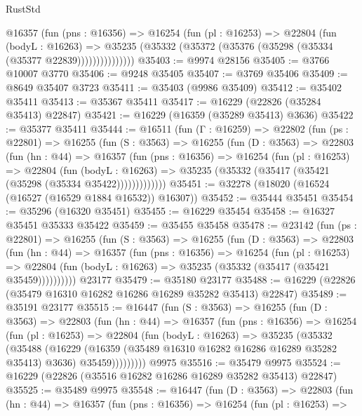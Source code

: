 \begin{lexlean}{RustStd}
\begin{coremodule}
              @16357
                (fun (pns : @16356) =>
                @16254
                  (fun (pl : @16253) =>
                  @22804
                    (fun (bodyL : @16263) =>
                    @35235 (@35332 (@35372 (@35376 (@35298 (@35334 (@35377 @22839)))))))))))))))
@35403 := @9974 @28156
@35405 := @3766 @10007 @3770
@35406 := @9248 @35405
@35407 := @3769 @35406
@35409 := @8649 @35407 @3723
@35411 := @35403 (@9986 @35409)
@35412 := @35402 @35411
@35413 := @35367 @35411
@35417 := @16229 (@22826 (@35284 @35413) @22847)
@35421 := @16229 (@16359 (@35289 @35413) @3636)
@35422 := @35377 @35411
@35444 := @16511
    (fun (Γ : @16259) =>
    @22802
      (fun (ps : @22801) =>
      @16255
        (fun (S : @3563) =>
        @16255
          (fun (D : @3563) =>
          @22803
            (fun (hn : @44) =>
            @16357
              (fun (pns : @16356) =>
              @16254
                (fun (pl : @16253) =>
                @22804
                  (fun (bodyL : @16263) =>
                  @35235 (@35332 (@35417 (@35421 (@35298 (@35334 @35422)))))))))))))
@35451 := @32278 (@18020 (@16524 (@16527 (@16529 @1884 @16532)) @16307))
@35452 := @35444 @35451
@35454 := @35296 (@16320 @35451)
@35455 := @16229 @35454
@35458 := @16327 @35451 @35333 @35422
@35459 := @35455 @35458
@35478 := @23142
    (fun (ps : @22801) =>
    @16255
      (fun (S : @3563) =>
      @16255
        (fun (D : @3563) =>
        @22803
          (fun (hn : @44) =>
          @16357
            (fun (pns : @16356) =>
            @16254
              (fun (pl : @16253) =>
              @22804 (fun (bodyL : @16263) => @35235 (@35332 (@35417 (@35421 @35459))))))))))
    @23177
@35479 := @35180 @23177
@35488 := @16229 (@22826 (@35479 @16310 @16282 @16286 @16289 @35282 @35413) @22847)
@35489 := @35191 @23177
@35515 := @16447
    (fun (S : @3563) =>
    @16255
      (fun (D : @3563) =>
      @22803
        (fun (hn : @44) =>
        @16357
          (fun (pns : @16356) =>
          @16254
            (fun (pl : @16253) =>
            @22804
              (fun (bodyL : @16263) =>
              @35235
                (@35332
                  (@35488
                    (@16229
                      (@16359 (@35489 @16310 @16282 @16286 @16289 @35282 @35413) @3636)
                      @35459)))))))))
    @9975
@35516 := @35479 @9975
@35524 := @16229 (@22826 (@35516 @16282 @16286 @16289 @35282 @35413) @22847)
@35525 := @35489 @9975
@35548 := @16447
    (fun (D : @3563) =>
    @22803
      (fun (hn : @44) =>
      @16357
        (fun (pns : @16356) =>
        @16254
          (fun (pl : @16253) =>

\end{coremodule}
\end{lexlean}

